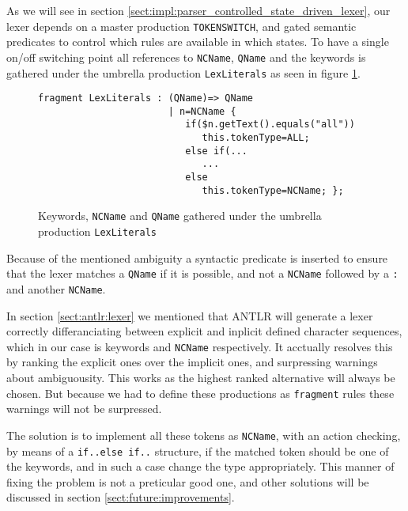 As we will see in section \ref{sect:impl:parser_controlled_state_driven_lexer}, our lexer depends on a master production \verb!TOKENSWITCH!, and gated semantic predicates to control which rules are available in which states. To have a single on/off switching point all references to \verb!NCName!, \verb!QName! and the keywords is gathered under the umbrella production \verb!LexLiterals! as seen in figure \ref{fig:lexLitterals}.

\begin{figure}[h!]
\begin{Verbatim}
fragment LexLiterals : (QName)=> QName
                       | n=NCName {
                          if($n.getText().equals("all")) 
                             this.tokenType=ALL;
                          else if(...
                             ...
                          else 
                             this.tokenType=NCName; };
\end{Verbatim}
\caption[Keywords, \texttt{NCName} and \texttt{QName} gathered under \texttt{LexLiterals}]{Keywords, \texttt{NCName} and \texttt{QName} gathered under the umbrella production \texttt{LexLiterals}}
\label{fig:lexLitterals}
\end{figure}

Because of the mentioned ambiguity a syntactic predicate is inserted to ensure that the lexer matches a \verb!QName! if it is possible, and not a \verb!NCName! followed by a \verb!:! and another \verb!NCName!.

In section \ref{sect:antlr:lexer} we mentioned that ANTLR will generate a lexer correctly differanciating between explicit and inplicit defined character sequences, which in our case is keywords and \verb!NCName! respectively. It acctually resolves this by ranking the explicit ones over the implicit ones, and surpressing warnings about ambiguousity. This works as the highest ranked alternative will always be chosen. But because we had to define these productions as \verb!fragment! rules these warnings will not be surpressed.

The solution is to implement all these tokens as \verb!NCName!, with an action checking, by means of a \verb!if..else if..! structure, if the matched token should be one of the keywords, and in such a case change the type appropriately. This manner of fixing the problem is not a preticular good one, and other solutions will be discussed in section \ref{sect:future:improvements}.
